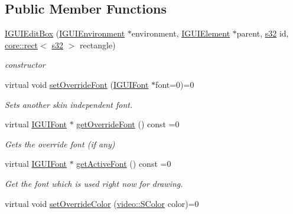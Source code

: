\subsection*{Public Member Functions}
\begin{DoxyCompactItemize}
\item 
\mbox{\label{classirr_1_1gui_1_1IGUIEditBox_a454f49d8d569bf61b45a31871cc6d301}} 
\hyperlink{classirr_1_1gui_1_1IGUIEditBox_a454f49d8d569bf61b45a31871cc6d301}{I\+G\+U\+I\+Edit\+Box} (\hyperlink{classirr_1_1gui_1_1IGUIEnvironment}{I\+G\+U\+I\+Environment} $\ast$environment, \hyperlink{classirr_1_1gui_1_1IGUIElement}{I\+G\+U\+I\+Element} $\ast$parent, \hyperlink{namespaceirr_ac66849b7a6ed16e30ebede579f9b47c6}{s32} id, \hyperlink{classirr_1_1core_1_1rect}{core\+::rect}$<$ \hyperlink{namespaceirr_ac66849b7a6ed16e30ebede579f9b47c6}{s32} $>$ rectangle)
\begin{DoxyCompactList}\small\item\em constructor \end{DoxyCompactList}\item 
virtual void \hyperlink{classirr_1_1gui_1_1IGUIEditBox_a7608fe327ec860712ec87b5e1dc4aec9}{set\+Override\+Font} (\hyperlink{classirr_1_1gui_1_1IGUIFont}{I\+G\+U\+I\+Font} $\ast$font=0)=0
\begin{DoxyCompactList}\small\item\em Sets another skin independent font. \end{DoxyCompactList}\item 
virtual \hyperlink{classirr_1_1gui_1_1IGUIFont}{I\+G\+U\+I\+Font} $\ast$ \hyperlink{classirr_1_1gui_1_1IGUIEditBox_a4c5e6749a5ac390d6a10303babd845b8}{get\+Override\+Font} () const =0
\begin{DoxyCompactList}\small\item\em Gets the override font (if any) \end{DoxyCompactList}\item 
virtual \hyperlink{classirr_1_1gui_1_1IGUIFont}{I\+G\+U\+I\+Font} $\ast$ \hyperlink{classirr_1_1gui_1_1IGUIEditBox_a50542fa7f03a48458fac258a0949d987}{get\+Active\+Font} () const =0
\begin{DoxyCompactList}\small\item\em Get the font which is used right now for drawing. \end{DoxyCompactList}\item 
virtual void \hyperlink{classirr_1_1gui_1_1IGUIEditBox_aa134d2a36c52abcb4881da0267031c47}{set\+Override\+Color} (\hyperlink{classirr_1_1video_1_1SColor}{video\+::\+S\+Color} color)=0

\end{DoxyCompactItemize}
